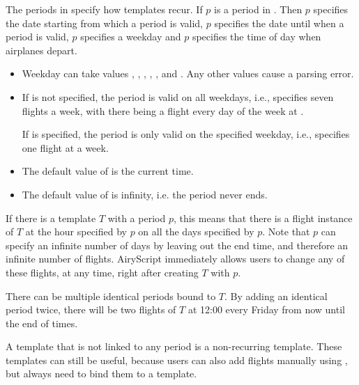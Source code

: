 The periods in  specify how templates recur. If $p$ is a period
in . Then $p$ specifies the date starting from which
a period is valid, $p$ specifies the date until when a period is valid,
$p$ specifies a weekday and $p$ specifies the time
of day when airplanes depart.
    \begin{itemize}
      \item Weekday can take values , , ,
        , ,  and . Any other
        values cause a parsing error.
      \item If  is not specified, the period is valid on all
        weekdays, i.e., specifies seven flights a week, with there being a
        flight every day of the week at .
        
        If  is specified, the period is only valid on the specified
        weekday, i.e., specifies one flight at  a week.
      \item The default value of  is the current time.
      \item The default value of  is infinity, i.e. the period never
        ends.
      \begin{texa}
      \end{texa}
      \begin{texa}
      \end{texa}
    \end{itemize}
If there is a template $T$ with a period $p$, this means that there is a
flight instance of $T$ at the hour specified by $p$ on all the days
specified by $p$. Note that $p$ can specify an infinite number of days by
leaving out the end time, and therefore an infinite number of flights.
AiryScript immediately allows users to change any of these flights, at any
time, right after creating $T$ with $p$.

There can be multiple identical periods bound to $T$. By adding an
identical period twice, there will be two flights of $T$ at 12:00 every
Friday from now until the end of times.
\begin{texa}
\end{texa}
\vspace{\baselineskip}
A template that is not linked to any period is a non-recurring template.
These templates can still be useful, because users can also add flights
manually using , but always need to bind them to a
template.

